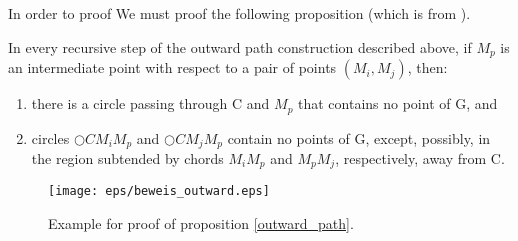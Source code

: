 In order to proof We must proof the following proposition (which is from \cite{kanj}).

\begin{prop}
\label{outward_path}
In every recursive step of the outward path construction described above, if $M_p $ is an intermediate point with respect to a pair of points $(M_i, M_j) $, then:
\begin{enumerate}
\item there is a circle passing through C and $M_p $ that contains no point of G, and
\item circles $\bigcirc{CM_iM_p} $ and $\bigcirc{CM_jM_p} $ contain no points of G, except, possibly, in the region subtended by chords $M_iM_p $ and $M_pM_j $, respectively, away from C.
\end{enumerate}
\end{prop}

\begin{figure}[h!]
\centering
\texttt{[image: eps/beweis\_outward.eps]}
\caption{Example for proof of proposition \ref{outward_path}.}
\label{fig:outward_path_beweis}
\end{figure}

